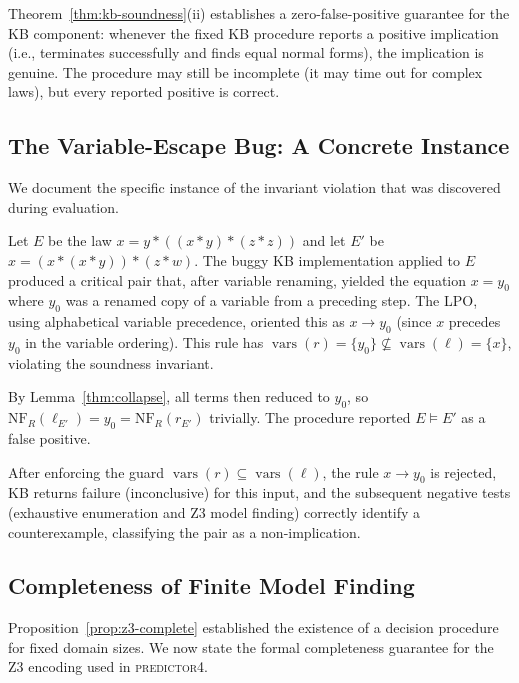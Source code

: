 \begin{remark}
Theorem~\ref{thm:kb-soundness}(ii) establishes a zero-false-positive guarantee for
the KB component: whenever the fixed KB procedure reports a positive implication
(i.e., terminates successfully and finds equal normal forms), the implication is
genuine.  The procedure may still be incomplete (it may time out for complex laws),
but every reported positive is correct.
\end{remark}

\subsection{The Variable-Escape Bug: A Concrete Instance}

We document the specific instance of the invariant violation that was discovered
during evaluation.

\begin{example}\label{ex:bug}
Let $E$ be the law $x = y * ((x * y) * (z * z))$ and let $E'$ be
$x = (x * (x * y)) * (z * w)$.  The buggy KB implementation applied to $E$
produced a critical pair that, after variable renaming, yielded the equation
$x = y_0$ where $y_0$ was a renamed copy of a variable from a preceding step.
The LPO, using alphabetical variable precedence, oriented this as $x \to y_0$
(since $x$ precedes $y_0$ in the variable ordering).  This rule has
$\operatorname{vars}(r) = \{y_0\} \not\subseteq \operatorname{vars}(\ell) = \{x\}$, violating the soundness
invariant.

By Lemma~\ref{thm:collapse}, all terms then reduced to $y_0$, so
$\mathrm{NF}_R(\ell_{E'}) = y_0 = \mathrm{NF}_R(r_{E'})$ trivially.  The procedure
reported $E \models E'$ as a false positive.

After enforcing the guard $\operatorname{vars}(r) \subseteq \operatorname{vars}(\ell)$, the rule
$x \to y_0$ is rejected, KB returns failure (inconclusive) for this input, and the
subsequent negative tests (exhaustive enumeration and Z3 model finding) correctly
identify a counterexample, classifying the pair as a non-implication.
\end{example}

\subsection{Completeness of Finite Model Finding}

Proposition~\ref{prop:z3-complete} established the existence of a decision procedure
for fixed domain sizes.  We now state the formal completeness guarantee for the Z3
encoding used in \textsc{predictor4}.

